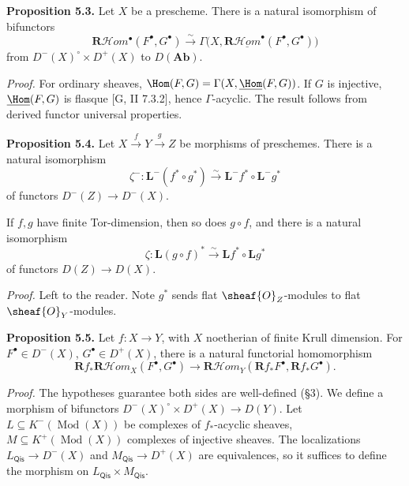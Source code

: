 \textbf{Proposition 5.3.}
Let $X$ be a prescheme. There is a natural isomorphism of bifunctors
\[
\mathbf{R}\mathcal{H}\textit{om}^\bullet(F^\bullet,G^\bullet)
\xrightarrow{\sim}
\Gamma\big(X,\mathbf{R}\underline{\mathcal{H}\textit{om}}^\bullet(F^\bullet,G^\bullet)\big)
\]
from $D^-(X)^\circ\times D^+(X)$ to $D(\mathbf{Ab})$.

\textit{Proof.}
For ordinary sheaves, $\Hom(F,G)=\Gamma(X,\underline{\Hom}(F,G))$.
If $G$ is injective, $\underline{\Hom}(F,G)$ is flasque [G, II 7.3.2], hence $\Gamma$-acyclic.
The result follows from derived functor universal properties.

\textbf{Proposition 5.4.}
Let $X\xrightarrow{f} Y\xrightarrow{g} Z$ be morphisms of preschemes.
There is a natural isomorphism
\[
\zeta^-\colon \mathbf{L}^-(f^*\circ g^*)
\xrightarrow{\sim}
\mathbf{L}^-f^*\circ\mathbf{L}^-g^*
\]
of functors $D^-(Z)\to D^-(X)$.

If $f,g$ have finite Tor-dimension, then so does $g\circ f$, and there is a natural isomorphism
\[
\zeta\colon \mathbf{L}(g\circ f)^*
\xrightarrow{\sim}
\mathbf{L}f^*\circ\mathbf{L}g^*
\]
of functors $D(Z)\to D(X)$.

\setcounter{page}{103}
\textit{Proof.}
Left to the reader. Note $g^*$ sends flat $\sheaf{O}_Z$-modules to flat $\sheaf{O}_Y$-modules.

\textbf{Proposition 5.5.}
Let $f\colon X\to Y$, with $X$ noetherian of finite Krull dimension.
For $F^\bullet\in D^-(X)$, $G^\bullet\in D^+(X)$, there is a natural functorial homomorphism
\[
\mathbf{R}f_*\mathbf{R}\mathcal{H}\textit{om}_X(F^\bullet,G^\bullet)
\to
\mathbf{R}\mathcal{H}\textit{om}_Y(\mathbf{R}f_*F^\bullet,\mathbf{R}f_*G^\bullet).
\]

\textit{Proof.}
The hypotheses guarantee both sides are well-defined (\S3).
We define a morphism of bifunctors $D^-(X)^\circ\times D^+(X)\to D(Y)$.
Let $L\subseteq K^-(\operatorname{Mod}(X))$ be complexes of $f_*$-acyclic sheaves,
$M\subseteq K^+(\operatorname{Mod}(X))$ complexes of injective sheaves.
The localizations $L_{\mathsf{Qis}}\to D^-(X)$ and $M_{\mathsf{Qis}}\to D^+(X)$ are equivalences,
so it suffices to define the morphism on $L_{\mathsf{Qis}}\times M_{\mathsf{Qis}}$.

